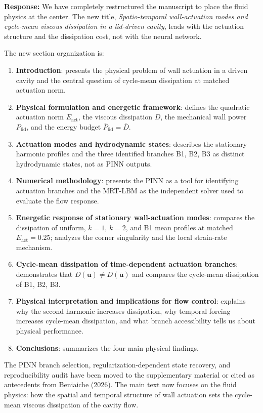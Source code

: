 \documentclass[11pt,a4paper]{article}
\begin{document}
\vspace{0.5em}

\noindent\textbf{Response:} We have completely restructured the manuscript to
place the fluid physics at the center. The new title,
\textit{Spatio-temporal wall-actuation modes and cycle-mean viscous dissipation
in a lid-driven cavity}, leads with the actuation structure and the dissipation
cost, not with the neural network.

The new section organization is:
\begin{enumerate}
\item \textbf{Introduction}: presents the physical problem of wall actuation in
  a driven cavity and the central question of cycle-mean dissipation at matched
  actuation norm.
\item \textbf{Physical formulation and energetic framework}: defines the
  quadratic actuation norm $E_{\mathrm{act}}$, the viscous dissipation $D$, the
  mechanical wall power $P_{\mathrm{lid}}$, and the energy budget
  $\overline{P}_{\mathrm{lid}} = \overline{D}$.
\item \textbf{Actuation modes and hydrodynamic states}: describes the
  stationary harmonic profiles and the three identified branches B1, B2, B3 as
  distinct hydrodynamic states, not as PINN outputs.
\item \textbf{Numerical methodology}: presents the PINN as a tool for
  identifying actuation branches and the MRT-LBM as the independent solver used
  to evaluate the flow response.
\item \textbf{Energetic response of stationary wall-actuation modes}: compares
  the dissipation of uniform, $k=1$, $k=2$, and B1 mean profiles at matched
  $E_{\mathrm{act}} = 0.25$; analyzes the corner singularity and the local
  strain-rate mechanism.
\item \textbf{Cycle-mean dissipation of time-dependent actuation branches}:
  demonstrates that $\overline{D(\mathbf{u})} \neq D(\overline{\mathbf{u}})$
  and compares the cycle-mean dissipation of B1, B2, B3.
\item \textbf{Physical interpretation and implications for flow control}:
  explains why the second harmonic increases dissipation, why temporal forcing
  increases cycle-mean dissipation, and what branch accessibility tells us about
  physical performance.
\item \textbf{Conclusions}: summarizes the four main physical findings.
\end{enumerate}

The PINN branch selection, regularization-dependent state recovery, and
reproducibility audit have been moved to the supplementary material or cited as
antecedents from Beniaiche (2026). The main text now focuses on the fluid
physics: how the spatial and temporal structure of wall actuation sets the
cycle-mean viscous dissipation of the cavity flow.
\end{document}
